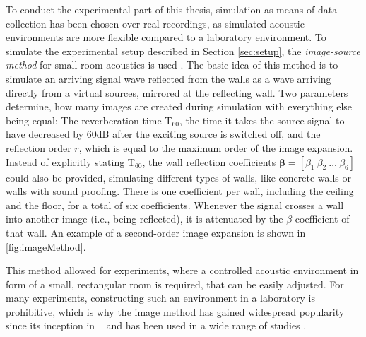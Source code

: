 To conduct the experimental part of this thesis, simulation as means of data collection has been chosen over real recordings, as simulated acoustic environments are more flexible compared to a laboratory environment. To simulate the experimental setup  described in Section \ref{sec:setup}, the \emph{image-source method} for small-room acoustics is used \cite{Allen1979}. The basic idea of this method is to simulate an arriving signal wave reflected from the walls as a wave arriving directly from a virtual sources, mirrored at the reflecting wall. Two parameters determine, how many images are created during simulation with everything else being equal: The reverberation time T$_{60}$, the time it takes the source signal to have decreased by 60dB after the exciting source is switched off, and the reflection order $r$, which is equal to the maximum order of the image expansion. Instead of explicitly stating T$_{60}$, the wall reflection coefficients $\bm\beta = [\beta_1~\beta_2~\dots~\beta_6]$ could also be provided, simulating different types of walls, like concrete walls or walls with sound proofing. There is one coefficient per wall, including the ceiling and the floor, for a total of six coefficients. Whenever the signal crosses a wall into another image (i.e., being reflected), it is attenuated by the $\beta$-coefficient of that wall. An example of a second-order image expansion is shown in \autoref{fig:imageMethod}.

This method allowed for experiments, where a controlled acoustic environment in form of a small, rectangular room is required, that can be easily adjusted. For many experiments, constructing such an environment in a laboratory is prohibitive, which is why the image method has gained widespread popularity since its inception in \citeyear{Allen1979}~\cite{Allen1979} and has been used in a wide range of studies \cite{Champagne1996}.

